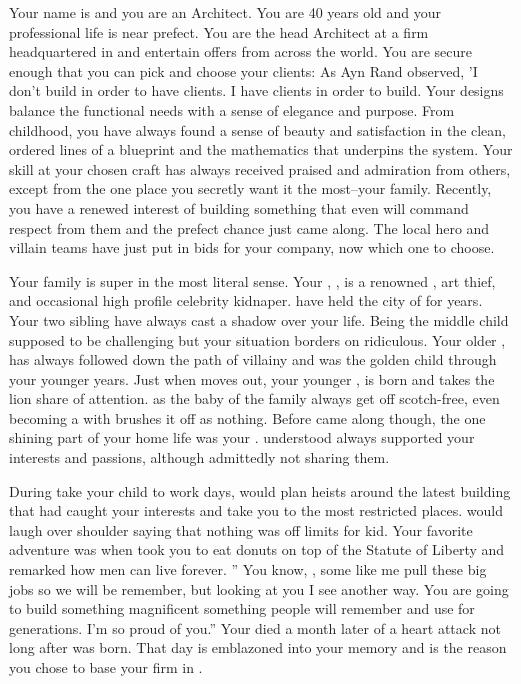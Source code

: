 \documentclass[char]{LRSguildcamp1}
\begin{document}
\name{\cArchitect{}}


Your name is \cArchitect{\intro} and you are an Architect. You are 40 years old and your professional life is near prefect. You are the head Architect at a firm headquartered in \pCityArchitect{} and entertain offers from across the world.  You are secure enough that you can pick and choose your clients: As Ayn Rand observed, 'I don't build in order to have clients. I have clients in order to build. Your designs balance the functional needs with a sense of elegance and purpose. From childhood, you have always found a sense of beauty and satisfaction in the clean, ordered lines of a blueprint and the mathematics that underpins the system. Your skill at your chosen craft has always received praised and admiration from others, except from the one place you secretly want it the most--your family. Recently, you have a renewed interest of building something that even will command respect from them and the prefect chance just came along. The local hero and villain teams have just put in bids for your company, now which one to choose.

Your family is super in the most literal sense. Your \cGrandma{\parent}, \cGrandma{}, is a renowned \cGrandma{\villain}, art thief, and occasional high profile celebrity kidnaper. \cGrandma{\They} have held the city of \pCityGrandma{} for years. Your two sibling have always cast a shadow over your life. Being the middle child supposed to be challenging but your situation borders on ridiculous. Your older \cOldest{\sibling}, \cOldest{} has always followed \cGrandma{} down the path of villainy and was the golden child through your younger years. Just when \cOldest{} moves out, your younger \cYoungest{\sibling}, \cYoungest{} is born and takes the lion share of attention. \cYoungest{\They} as the baby of the family always get off scotch-free, even becoming a \cYoungest{\hero} with \cGrandma{} brushes it off as nothing. Before \cYoungest{} came along though, the one shining part of your home life was your \cGrandpa{\parent} \cGrandpa{}. \cGrandpa{} understood always supported your interests and passions, although admittedly not sharing them. 

During take your child to work days, \cGrandpa{} would plan \cGrandpa{\their} heists around the latest building that had caught your interests and take you to the most restricted places. \cGrandpa{} would laugh over \cGrandpa{\their} shoulder saying that nothing was off limits for \cGrandpa{\their} kid. Your favorite adventure was when \cGrandpa{\they} took you to eat donuts on top of the Statute of Liberty and remarked how men can live forever.  '' You know, \cArchitect{}, some \cGrandpa{\humans} like me pull these big jobs so we will be remember, but looking at you I see another way. You are going to build something magnificent something people will remember and use for generations. I'm so proud of you.'' Your \cGrandpa{\parent} died a month later of a heart attack not long after \cYoungest{} was born. That day is emblazoned into your memory and is the reason you chose to base your firm in \pCityArchitect{}.
\end{document}
